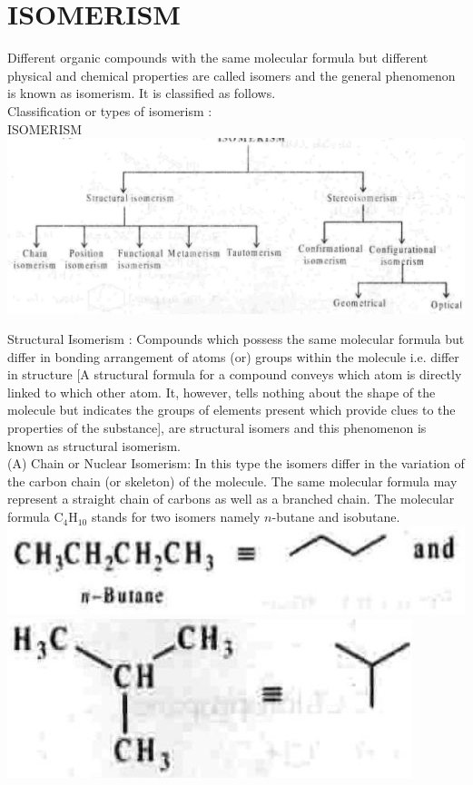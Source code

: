 \documentclass[10pt]{article}
\begin{document}
\section*{ISOMERISM}
Different organic compounds with the same molecular formula but different physical and chemical properties are called isomers and the general phenomenon is known as isomerism. It is classified as follows.\\
Classification or types of isomerism :\\
ISOMERISM\\
\includegraphics[max width=\textwidth, center]{2025_01_28_8470952b98110cec3aabg-038(1)}

Structural Isomerism : Compounds which possess the same molecular formula but differ in bonding arrangement of atoms (or) groups within the molecule i.e. differ in structure [A structural formula for a compound conveys which atom is directly linked to which other atom. It, however, tells nothing about the shape of the molecule but indicates the groups of elements present which provide clues to the properties of the substance], are structural isomers and this phenomenon is known as structural isomerism.\\
(A) Chain or Nuclear Isomerism: In this type the isomers differ in the variation of the carbon chain (or skeleton) of the molecule. The same molecular formula may represent a straight chain of carbons as well as a branched chain. The molecular formula $\mathrm{C}_{4} \mathrm{H}_{10}$ stands for two isomers namely $n$-butane and isobutane.\\
\includegraphics[max width=\textwidth, center]{2025_01_28_8470952b98110cec3aabg-039(11)}\\
\includegraphics[max width=\textwidth, center]{2025_01_28_8470952b98110cec3aabg-039(9)}
\end{document}
